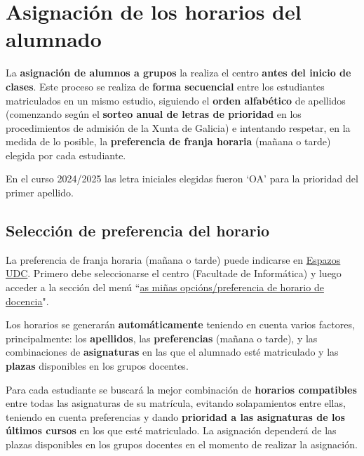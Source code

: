 \section{Asignación de los horarios del alumnado}

La \textbf{asignación de alumnos a grupos} la realiza el centro \textbf{antes del inicio de clases}. Este proceso se realiza de \textbf{forma secuencial} entre los estudiantes matriculados en un mismo estudio, siguiendo el \textbf{orden alfabético} de apellidos (comenzando según el \textbf{sorteo anual de letras de prioridad} en los procedimientos de admisión de la Xunta de Galicia) e intentando respetar, en la medida de lo posible, la \textbf{preferencia de franja horaria} (mañana o tarde) elegida por cada estudiante.

\begin{exampleBox}
    En el curso 2024/2025 las letra iniciales elegidas fueron `OA' para la prioridad del primer apellido.
\end{exampleBox}

\subsection{Selección de preferencia del horario}

La preferencia de franja horaria (mañana o tarde) puede indicarse en \href{\linkEspazosUDC}{Espazos UDC}. Primero debe seleccionarse el centro (Facultade de Informática) y luego acceder a la sección del menú ``\href{https://espazos.udc.es/centers/614/timetable/preference}{as miñas opcións/preferencia de horario de docencia}".

\FloatBarrier
\begin{figure}[htp]
    \centering
\end{figure}
\FloatBarrier

Los horarios se generarán \textbf{automáticamente} teniendo en cuenta varios factores, principalmente: los \textbf{apellidos}, las \textbf{preferencias} (mañana o tarde), y las combinaciones de \textbf{asignaturas} en las que el alumnado esté matriculado y las \textbf{plazas} disponibles en los grupos docentes.

Para cada estudiante se buscará la mejor combinación de \textbf{horarios compatibles} entre todas las asignaturas de su matrícula, evitando solapamientos entre ellas, teniendo en cuenta preferencias y dando \textbf{prioridad a las asignaturas de los últimos cursos} en los que esté matriculado. La asignación dependerá de las plazas disponibles en los grupos docentes en el momento de realizar la asignación.

